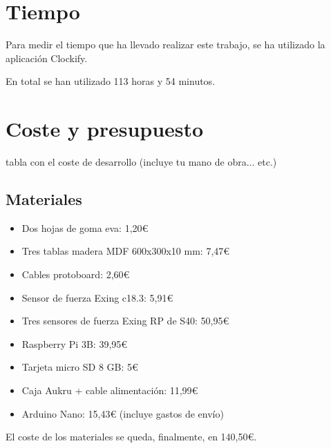 
    \section{Tiempo} %
    \label{sec:Tiempo}

        Para medir el tiempo que ha llevado realizar este trabajo, se ha utilizado la aplicación
        Clockify\cite{clockify}.\newline

        En total se han utilizado 113 horas y 54 minutos.%


    \section{Coste y presupuesto} %
    \label{sec:CosteYPresupuesto}

        tabla con el coste de desarrollo (incluye tu mano de obra... etc.)

        \subsection{Materiales} %
        \label{sub:Materiales}

            \begin{itemize}
                \item Dos hojas de goma eva: 1,20\euro{}
                \item Tres tablas madera MDF 600x300x10 mm: 7,47\euro{}
                \item Cables protoboard: 2,60\euro{}
                \item Sensor de fuerza Exing c18.3: 5,91\euro{}
                \item Tres sensores de fuerza Exing RP de S40: 50,95\euro{}
                \item Raspberry Pi 3B: 39,95\euro{}
                \item Tarjeta micro SD 8 GB: 5\euro{}
                \item Caja Aukru + cable alimentación: 11,99\euro{}
                \item Arduino Nano: 15,43\euro{} (incluye gastos de envío)
            \end{itemize}

            El coste de los materiales se queda, finalmente, en 140,50\euro{}.




\newpage
